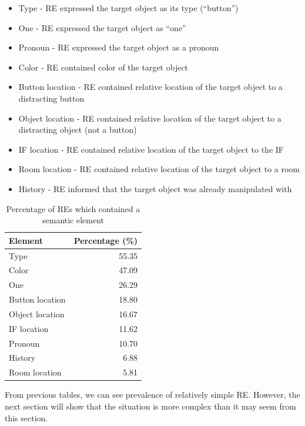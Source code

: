 \begin{itemize}
\item
Type - RE expressed the target object as its type (``button'')
\item
One - RE expressed the target object as ``one''
\item
Pronoun - RE expressed the target object as a pronoun
\item
Color -  RE contained color of the target object
\item
Button location - RE contained relative location of the target object to a distracting button
\item
Object location - RE contained relative location of the target object to a distracting object (not a button)
\item 
IF location - RE contained relative location of the target object to the IF
\item
Room location - RE contained relative location of the target object to a room
\item
History - RE informed that the target object was already manipulated with
\end{itemize}

\begin{table}[!htbp]
 \centering
\begin{tabular}{lr}
\toprule
Element  & Percentage (\%)  \\
\midrule
Type   			& 55.35\\
Color			& 47.09\\
One 				& 26.29\\
Button location & 18.80\\
Object location 	& 16.67\\
IF location		& 11.62\\
Pronoun			& 10.70\\
History			& 6.88\\
Room location 	& 5.81\\
\bottomrule
\end{tabular}
\caption{Percentage of REs which contained a semantic element}
\label{tab:res-contents}
\end{table} 

From previous tables, we can see prevalence of relatively simple RE. However, the next section will show that the situation is more complex than it may seem from this section.

